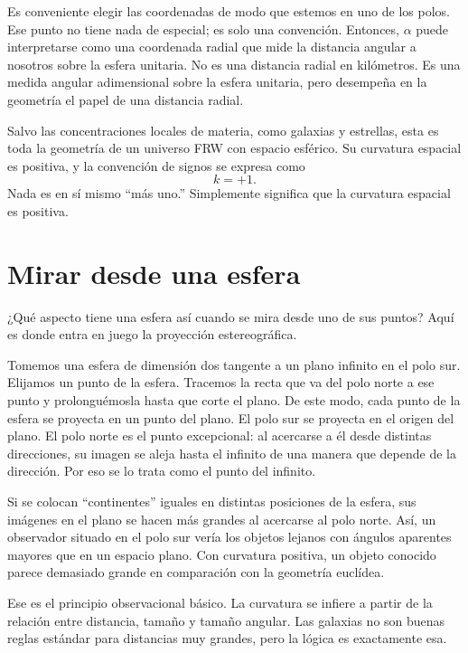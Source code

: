 Es conveniente elegir las coordenadas de modo que estemos en uno de los polos. Ese punto no tiene nada de especial; es solo una convención. Entonces, \(\alpha\) puede interpretarse como una coordenada radial que mide la distancia angular a nosotros sobre la esfera unitaria. No es una distancia radial en kilómetros. Es una medida angular adimensional sobre la esfera unitaria, pero desempeña en la geometría el papel de una distancia radial.

Salvo las concentraciones locales de materia, como galaxias y estrellas, esta es toda la geometría de un universo FRW con espacio esférico. Su curvatura espacial es positiva, y la convención de signos se expresa como
\begin{equation}
k=+1.
\end{equation}
Nada es en sí mismo ``más uno.'' Simplemente significa que la curvatura espacial es positiva.

\section{Mirar desde una esfera}

¿Qué aspecto tiene una esfera así cuando se mira desde uno de sus puntos? Aquí es donde entra en juego la proyección estereográfica.

Tomemos una esfera de dimensión dos tangente a un plano infinito en el polo sur. Elijamos un punto de la esfera. Tracemos la recta que va del polo norte a ese punto y prolonguémosla hasta que corte el plano. De este modo, cada punto de la esfera se proyecta en un punto del plano. El polo sur se proyecta en el origen del plano. El polo norte es el punto excepcional: al acercarse a él desde distintas direcciones, su imagen se aleja hasta el infinito de una manera que depende de la dirección. Por eso se lo trata como el punto del infinito.

Si se colocan ``continentes'' iguales en distintas posiciones de la esfera, sus imágenes en el plano se hacen más grandes al acercarse al polo norte. Así, un observador situado en el polo sur vería los objetos lejanos con ángulos aparentes mayores que en un espacio plano. Con curvatura positiva, un objeto conocido parece demasiado grande en comparación con la geometría euclídea.

Ese es el principio observacional básico. La curvatura se infiere a partir de la relación entre distancia, tamaño y tamaño angular. Las galaxias no son buenas reglas estándar para distancias muy grandes, pero la lógica es exactamente esa.

